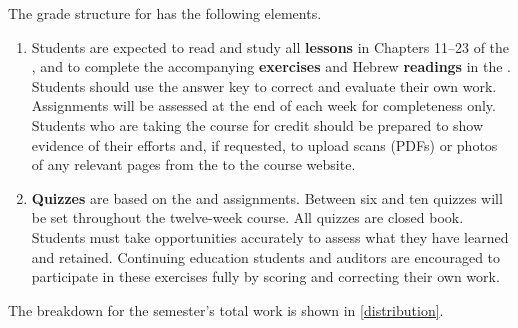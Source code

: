 \documentclass[titlepage]{article}
\begin{document}
The grade structure for \ccode has the following elements.

\begin{enumerate}
 \item
    Students are expected to read and study all \textbf{lessons} in
    Chapters 11–23 of the \cite{lbh}, and to complete the accompanying
    \textbf{exercises} and Hebrew \textbf{readings} in the \cite{work}.
    Students should use the answer key to correct and evaluate their own
    work. Assignments will be assessed at the end of each week for
    completeness only. Students who are taking the course for credit
    should be prepared to show evidence of their efforts and, if
    requested, to upload scans (PDFs) or photos of any relevant pages
    from the \cite{work} to the course website.
 \item
    \textbf{Quizzes} are based on the \cite{lbh} and \cite{work}
    assignments. Between six and ten quizzes will be set throughout the
    twelve-week course. All quizzes are closed book. Students must take
    opportunities accurately to assess what they have learned and
    retained. Continuing education students and auditors are encouraged
    to participate in these exercises fully by scoring and correcting
    their own work.

\end{enumerate}

The breakdown for the semester's total work is shown in
\autoref{distribution}.
\end{document}
